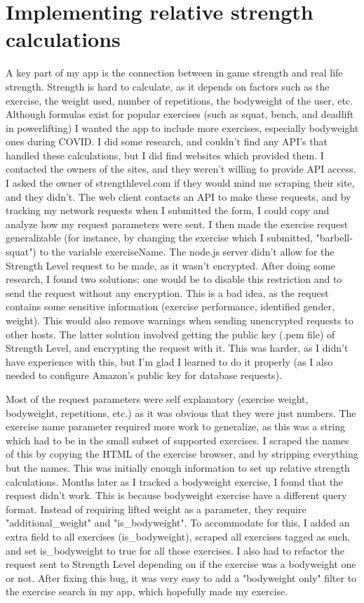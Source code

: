 \documentclass{l4proj}
\begin{document}
\section{Implementing relative strength calculations}
A key part of my app is the connection between in game strength and real life strength. Strength is hard to calculate, as it depends on factors such as the exercise, the weight used, number of repetitions, the bodyweight of the user, etc. Although formulas exist for popular exercises (such as squat, bench, and deadlift in powerlifting) I wanted the app to include more exercises, especially bodyweight ones during COVID. I did some research, and couldn't find any API's that handled these calculations, but I did find websites which provided them. I contacted the owners of the sites, and they weren't willing to provide API access. I asked the owner of strengthlevel.com if they would mind me scraping their site, and they didn't. The web client contacts an API to make these requests, and by tracking my network requests when I submitted the form, I could copy and analyze how my request parameters were sent. I then made the exercise request generalizable (for instance, by changing the exercise which I submitted, "barbell-squat") to the variable exerciseName. The node.js server didn't allow for the Strength Level request to be made, as it wasn't encrypted. After doing some research, I found two solutions: one would be to disable this restriction and to send the request without any encryption. This is a bad idea, as the request contains some sensitive information (exercise performance, identified gender, weight). This would also remove warnings when sending unencrypted requests to other hosts. The latter solution involved getting the public key (.pem file) of Strength Level, and encrypting the request with it. This was harder, as I didn't have experience with this, but I'm glad I learned to do it properly (as I also needed to configure Amazon's public key for database requests).

Most of the request parameters were self explanatory (exercise weight, bodyweight, repetitions, etc.) as it was obvious that they were just numbers. The exercise name parameter required more work to generalize, as this was a string which had to be in the small subset of supported exercises. I scraped the names of this by copying the HTML of the exercise browser, and by stripping everything but the names. This was initially enough information to set up relative strength calculations. Months later as I tracked a bodyweight exercise, I found that the request didn't work. This is because bodyweight exercise have a different query format. Instead of requiring lifted weight as a parameter, they require "additional\_weight" and "is\_bodyweight". To accommodate for this, I added an extra field to all exercises (is\_bodyweight), scraped all exercises tagged as such, and set is\_bodyweight to true for all those exercises. I also had to refactor the request sent to Strength Level depending on if the exercise was a bodyweight one or not. After fixing this bug, it was very easy to add a "bodyweight only" filter to the exercise search in my app, which hopefully made my exercise. 
\end{document}

